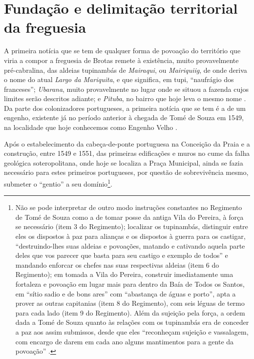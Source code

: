 \section{Fundação e delimitação territorial da freguesia}\label{sec:2.1}

A primeira notícia que se tem de qualquer forma de povoação do território que viria a compor a freguesia de Brotas remete à existência, muito provavelmente pré-cabralina, das aldeias tupinambás de \textit{Mairaqui}, ou \textit{Mairiquiig}, de onde deriva o nome do atual \textit{Largo da Mariquita}, e que significa, em tupi, ``naufrágio dos franceses''; \textit{Ubarana}, muito provavelmente no lugar onde se situou a fazenda cujos limites serão descritos adiante; e \textit{Pituba}, no bairro que hoje leva o mesmo nome \cite{azevedo_povoamento_1969,dorea_ruas_1999,sampaio_salvador_2016,VASCONCELOS2002}. Da parte dos colonizadores portugueses, a primeira notícia que se tem é a de um engenho, existente já no período anterior à chegada de Tomé de Souza em 1549, na localidade que hoje conhecemos como Engenho Velho \cite[p.~235]{sampaio_salvador_2016}.

Após o estabelecimento da cabeça-de-ponte portuguesa na Conceição da Praia e a construção, entre 1549 e 1551, das primeiras edificações e muros no cume da falha geológica soteropolitana, onde hoje se localiza a Praça Municipal, ainda se fazia necessário para estes primeiros portugueses, por questão de sobrevivência mesmo, submeter o ``gentio'' a seu domínio\footnote{Não se pode interpretar de outro modo instruções constantes no Regimento de Tomé de Souza como a de tomar posse da antiga Vila do Pereira, à força se necessário (item 3 do Regimento); localizar os tupinambás, distinguir entre eles os dispostos à paz para alianças e os dispostos à guerra para os castigar, ``destruindo-lhes suas aldeias e povoações, matando e cativando aquela parte deles que vos parecer que basta para seu castigo e exemplo de todos'' e mandando enforcar os chefes nas suas respectivas aldeias (item 6 do Regimento); em tomada a Vila do Pereira, construir imediatamente uma fortaleza e povoação em lugar mais para dentro da Baía de Todos os Santos, em ``sítio sadio e de bons ares'' com ``abastança de águas e porto'', apta a prover as outras capitanias (item 8 do Regimento), com seis léguas de termo para cada lado (item 9 do Regimento). Além da sujeição pela força, a ordem dada a Tomé de Souza quanto às relações com os tupinambás era de conceder a paz aos assim submissos, desde que eles ``reconheçam sujeição e vassalagem, com encargo de darem em cada ano alguns mantimentos para a gente da povoação'' \cite[pp.~81-101]{ruy_politica_1949}.}.

